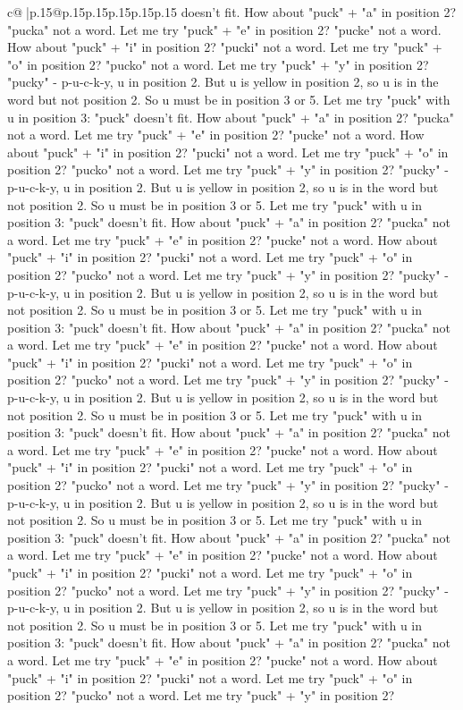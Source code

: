 \documentclass{article}
\begin{document}
{\begin{supertabular}{c@{$\;$}|p{.15\linewidth}@{}p{.15\linewidth}p{.15\linewidth}p{.15\linewidth}p{.15\linewidth}p{.15\linewidth}}
{{{doesn't fit. How about "puck" + "a" in position 2? "pucka" not a word. Let me try "puck" + "e" in position 2? "pucke" not a word. How about "puck" + "i" in position 2? "pucki" not a word. Let me try "puck" + "o" in position 2? "pucko" not a word. Let me try "puck" + "y" in position 2? "pucky" {-} p{-}u{-}c{-}k{-}y, u in position 2. But u is yellow in position 2, so u is in the word but not position 2. So u must be in position 3 or 5. Let me try "puck" with u in position 3: "puck" doesn't fit. How about "puck" + "a" in position 2? "pucka" not a word. Let me try "puck" + "e" in position 2? "pucke" not a word. How about "puck" + "i" in position 2? "pucki" not a word. Let me try "puck" + "o" in position 2? "pucko" not a word. Let me try "puck" + "y" in position 2? "pucky" {-} p{-}u{-}c{-}k{-}y, u in position 2. But u is yellow in position 2, so u is in the word but not position 2. So u must be in position 3 or 5. Let me try "puck" with u in position 3: "puck" doesn't fit. How about "puck" + "a" in position 2? "pucka" not a word. Let me try "puck" + "e" in position 2? "pucke" not a word. How about "puck" + "i" in position 2? "pucki" not a word. Let me try "puck" + "o" in position 2? "pucko" not a word. Let me try "puck" + "y" in position 2? "pucky" {-} p{-}u{-}c{-}k{-}y, u in position 2. But u is yellow in position 2, so u is in the word but not position 2. So u must be in position 3 or 5. Let me try "puck" with u in position 3: "puck" doesn't fit. How about "puck" + "a" in position 2? "pucka" not a word. Let me try "puck" + "e" in position 2? "pucke" not a word. How about "puck" + "i" in position 2? "pucki" not a word. Let me try "puck" + "o" in position 2? "pucko" not a word. Let me try "puck" + "y" in position 2? "pucky" {-} p{-}u{-}c{-}k{-}y, u in position 2. But u is yellow in position 2, so u is in the word but not position 2. So u must be in position 3 or 5. Let me try "puck" with u in position 3: "puck" doesn't fit. How about "puck" + "a" in position 2? "pucka" not a word. Let me try "puck" + "e" in position 2? "pucke" not a word. How about "puck" + "i" in position 2? "pucki" not a word. Let me try "puck" + "o" in position 2? "pucko" not a word. Let me try "puck" + "y" in position 2? "pucky" {-} p{-}u{-}c{-}k{-}y, u in position 2. But u is yellow in position 2, so u is in the word but not position 2. So u must be in position 3 or 5. Let me try "puck" with u in position 3: "puck" doesn't fit. How about "puck" + "a" in position 2? "pucka" not a word. Let me try "puck" + "e" in position 2? "pucke" not a word. How about "puck" + "i" in position 2? "pucki" not a word. Let me try "puck" + "o" in position 2? "pucko" not a word. Let me try "puck" + "y" in position 2? "pucky" {-} p{-}u{-}c{-}k{-}y, u in position 2. But u is yellow in position 2, so u is in the word but not position 2. So u must be in position 3 or 5. Let me try "puck" with u in position 3: "puck" doesn't fit. How about "puck" + "a" in position 2? "pucka" not a word. Let me try "puck" + "e" in position 2? "pucke" not a word. How about "puck" + "i" in position 2? "pucki" not a word. Let me try "puck" + "o" in position 2? "pucko" not a word. Let me try "puck" + "y" in position 2? }}}
\end{supertabular}}
\end{document}
